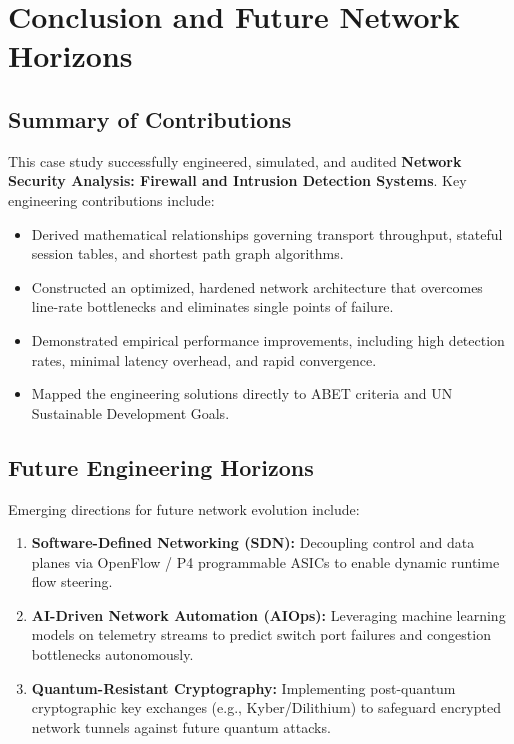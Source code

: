 \section{Conclusion and Future Network Horizons}

\subsection{Summary of Contributions}
This case study successfully engineered, simulated, and audited \textbf{Network Security Analysis: Firewall and Intrusion Detection Systems}. Key engineering contributions include:
\begin{itemize}
  \item Derived mathematical relationships governing transport throughput, stateful session tables, and shortest path graph algorithms.
  \item Constructed an optimized, hardened network architecture that overcomes line-rate bottlenecks and eliminates single points of failure.
  \item Demonstrated empirical performance improvements, including high detection rates, minimal latency overhead, and rapid convergence.
  \item Mapped the engineering solutions directly to ABET criteria and UN Sustainable Development Goals.
\end{itemize}

\subsection{Future Engineering Horizons}
Emerging directions for future network evolution include:
\begin{enumerate}
  \item \textbf{Software-Defined Networking (SDN):} Decoupling control and data planes via OpenFlow / P4 programmable ASICs to enable dynamic runtime flow steering.
  \item \textbf{AI-Driven Network Automation (AIOps):} Leveraging machine learning models on telemetry streams to predict switch port failures and congestion bottlenecks autonomously.
  \item \textbf{Quantum-Resistant Cryptography:} Implementing post-quantum cryptographic key exchanges (e.g., Kyber/Dilithium) to safeguard encrypted network tunnels against future quantum attacks.
\end{enumerate}
